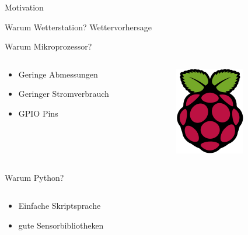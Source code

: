 \begin{frame}[t]{Motivation}
	\begin{block}{Warum Wetterstation?}
		Wettervorhersage
	\end{block}
	\begin{block}{Warum Mikroprozessor?}
		\begin{columns}[onlytextwidth]
			\begin{column}{0.8\textwidth}
		\begin{itemize}
			\item Geringe Abmessungen
			\item Geringer Stromverbrauch
			\item GPIO Pins
		\end{itemize}
			\end{column}
			\begin{column}{0.2\textwidth}
				\centering
				\vspace{-0.2cm}
				\includegraphics[width=0.5\linewidth]{picture/raspberry.png}
			\end{column}
		\end{columns}
	\end{block}
	\begin{block}{Warum Python?}
		\begin{columns}[onlytextwidth]
			\begin{column}{0.8\textwidth}
				\begin{itemize}
					\item Einfache Skriptsprache
					\item gute Sensorbibliotheken
				\end{itemize}
			\end{column}
			\begin{column}{0.2\textwidth}
				\centering

\end{column}
\end{columns}
\end{block}
\end{frame}

